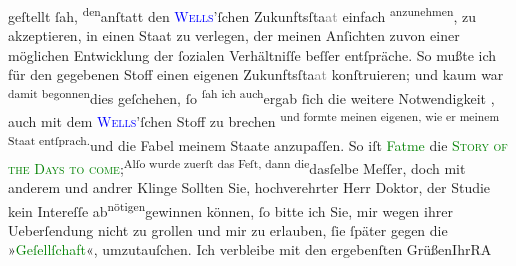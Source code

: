                         geſtellt ſah\introOben{}, \substVorne{}\textsuperscript{den}\substDazwischen{}\substHinten{}{ }\introOben{}an\introOben{}ſtatt den \textcolor{blue}{\textsc{Wells}}{}\ledrightnote{\textcolor{blue}{H. G. Wells}}’ſchen \introOben{}Zukunftsſta\textcolor{gray}{at}\introOben{} einfach \substVorne{}\textsuperscript{anzunehmen}{\allowbreak}\substDazwischen{}\substHinten{}, \introOben{} zu akzeptieren, in einen Staat zu
                        verlegen, der\introOben{} meinen  Anſichten
                        \introOben{}zu\introOben{}{ }\introOben{}von einer möglichen Entwicklung der ſozialen Verhältniſſe
                        beſſer entſpräche. So mußte ich für den gegebenen Stoff einen eigenen
                            Zukunftsſta\textcolor{gray}{at}\introOben{} konſtruieren; und kaum {\pb}war \substVorne{}\textsuperscript{damit begonnen}{\allowbreak}\substDazwischen{}dies geſchehen\substHinten{}, ſo \substVorne{}\textsuperscript{ſah ich auch}{\allowbreak}\substDazwischen{}ergab ſich\substHinten{} die \introOben{}weitere\introOben{} Notwendigkeit , \introOben{}auch\introOben{} mit dem
                        \textcolor{blue}{\textsc{Wells}}{}\ledrightnote{\textcolor{blue}{H. G. Wells}}’ſchen Stoff zu brechen \substVorne{}\textsuperscript{und formte meinen eigenen, wie er meinem Staat
                            entſprach.}{\allowbreak}\substDazwischen{}und die Fabel meinem Staate anzupaſſen. So iſt \textcolor{green}{Fatme}{}\ledrightnote{\textcolor{green}{Fatme}} die \textcolor{green}{\textsc{Story of the Days to come}}{}\ledrightnote{\textcolor{green}{Gesellschaft [Eine Gaunerkomödie]}};\substHinten{}{ }\substVorne{}\textsuperscript{Alſo wurde zuerſt das Feſt, dann die}{\allowbreak}\substDazwischen{}dasſelbe Meſſer, doch mit anderem und andrer\substHinten{} Klinge \pend
           \pstart
           Sollten Sie, hochverehrter Herr Doktor, der Studie kein Intereſſe ab\substVorne{}\textsuperscript{nötigen}{\allowbreak}\substDazwischen{}gewinnen\substHinten{} können, ſo bitte ich Sie, mir wegen ihrer Ueberſendung nicht zu grollen
                    und mir zu erlauben, ſie \introOben{}ſpäter\introOben{} gegen die »\textcolor{green}{Geſellſchaft}{}\ledrightnote{\textcolor{green}{Gesellschaft [Eine Gaunerkomödie]}}«,  umzutauſchen.\pend
           \pstart Ich verbleibe mit den ergebenſten Grüßen\hspace*{1.5em}Ihr\hspace*{1.5em}\spacefill\mbox{RA}\pend{}\endnumbering{}  
      